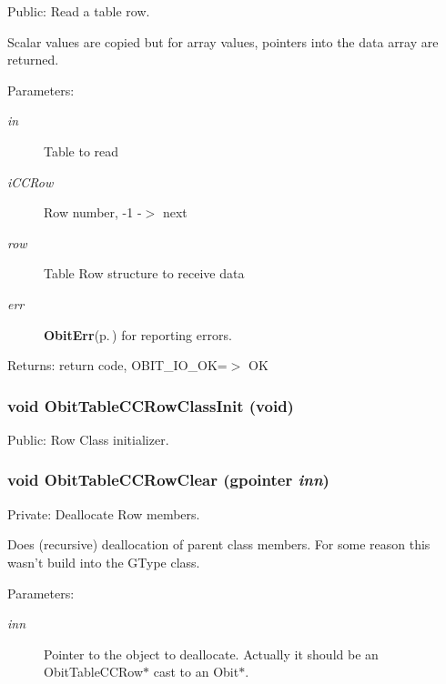 Public: Read a table row. 

Scalar values are copied but for array values, pointers into the data array are returned. \begin{Desc}
\item[Parameters:]
\begin{description}
\item[{\em in}]Table to read \item[{\em i\-CCRow}]Row number, -1 -$>$ next \item[{\em row}]Table Row structure to receive data \item[{\em err}]{\bf Obit\-Err}{\rm (p.\,\pageref{structObitErr})} for reporting errors. \end{description}
\end{Desc}
\begin{Desc}
\item[Returns:]return code, OBIT\_\-IO\_\-OK=$>$ OK \end{Desc}
\subsubsection{\setlength{\rightskip}{0pt plus 5cm}void Obit\-Table\-CCRow\-Class\-Init (void)}\label{ObitTableCC_8c_a26}


Public: Row Class initializer. 

\subsubsection{\setlength{\rightskip}{0pt plus 5cm}void Obit\-Table\-CCRow\-Clear (gpointer {\em inn})}\label{ObitTableCC_8c_a7}


Private: Deallocate Row members. 

Does (recursive) deallocation of parent class members. For some reason this wasn't build into the GType class. \begin{Desc}
\item[Parameters:]
\begin{description}
\item[{\em inn}]Pointer to the object to deallocate. Actually it should be an Obit\-Table\-CCRow$\ast$ cast to an Obit$\ast$. \end{description}
\end{Desc}
